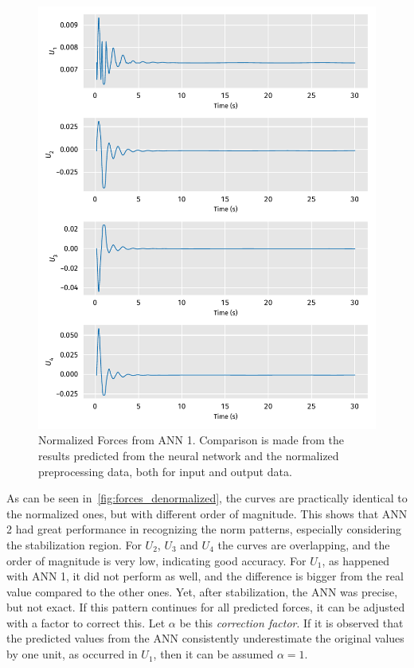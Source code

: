 \begin{figure}[!htb]
    \centering
    \caption[Normalized Forces from ANN 1]{Normalized Forces from ANN 1. Comparison is made from the results predicted from the neural network and the normalized preprocessing data, both for input and output data.}
    \includegraphics{../codes/models/model_alpha/figures/normalized_forces.pdf}

    \label{fig:forces_normalized}
\end{figure}

As can be seen in~\cref{fig:forces_denormalized}, the curves are practically identical to the normalized ones, but with different order of magnitude.
This shows that ANN 2 had great performance in recognizing the norm patterns, especially considering the stabilization region.
For \(U_2\), \(U_3\) and \(U_4\) the curves are overlapping, and the order of magnitude is very low, indicating good accuracy.
For \(U_1\), as happened with ANN 1, it did not perform as well, and the difference is bigger from the real value compared to the other ones. Yet, after stabilization, the ANN was precise, but not exact. 
If this pattern continues for all predicted forces, it can be adjusted with a factor to correct this.
Let \(\alpha\) be this \emph{correction factor}. 
If it is observed that the predicted values from the ANN consistently underestimate the original values by one unit, as occurred in \(U_1\), then it can be assumed \(\alpha = 1\).

